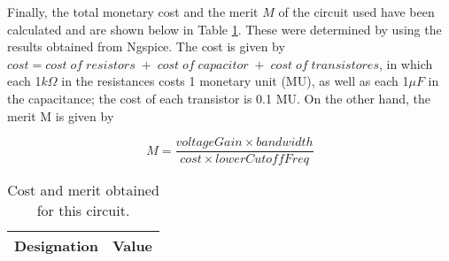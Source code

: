 Finally, the total monetary cost and the merit $M$ of the circuit used have been calculated and are shown below in Table \ref{tab:rip1}. These were determined by using the results obtained from Ngspice. The cost is given by $cost=cost\; of\; resistors\; +\; cost\; of\; capacitor\; +\; cost\; of\; transistores$, in which each 1$k\Omega$ in the resistances costs 1 monetary unit (MU), as well as each 1$\mu F$ in the capacitance; the cost of each transistor is 0.1 MU. On the other hand, the  merit M is given by

\begin{equation} \label{eq:merit}
  M=\frac{voltageGain \times bandwidth}{cost\times lowerCutoffFreq} 
\end{equation}


\begin{table}[H]
  \centering
  \begin{tabular}{|c|c|}
    \hline
        {\bf Designation} & {\bf Value} \\ \hline
        
  \end{tabular}
  \caption{Cost and merit obtained for this circuit.} 
  \label{tab:rip1}
\end{table}
